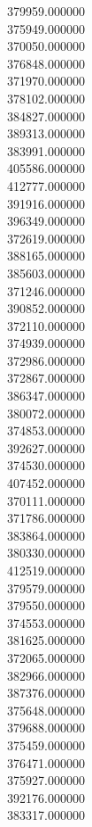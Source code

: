 379959.000000\\
375949.000000\\
370050.000000\\
376848.000000\\
371970.000000\\
378102.000000\\
384827.000000\\
389313.000000\\
383991.000000\\
405586.000000\\
412777.000000\\
391916.000000\\
396349.000000\\
372619.000000\\
388165.000000\\
385603.000000\\
371246.000000\\
390852.000000\\
372110.000000\\
374939.000000\\
372986.000000\\
372867.000000\\
386347.000000\\
380072.000000\\
374853.000000\\
392627.000000\\
374530.000000\\
407452.000000\\
370111.000000\\
371786.000000\\
383864.000000\\
380330.000000\\
412519.000000\\
379579.000000\\
379550.000000\\
374553.000000\\
381625.000000\\
372065.000000\\
382966.000000\\
387376.000000\\
375648.000000\\
379688.000000\\
375459.000000\\
376471.000000\\
375927.000000\\
392176.000000\\
383317.000000\\
